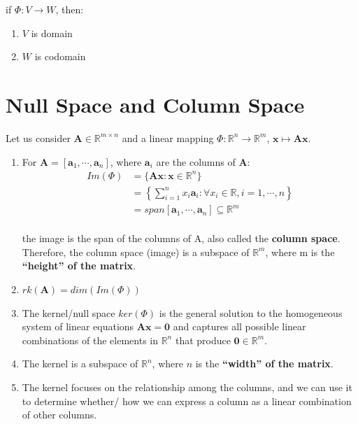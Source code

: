 if $\Phi : V \to W$, then:
\begin{enumerate}
    \item $V$ is domain
    \item $W$ is codomain
\end{enumerate}


\section{Null Space and Column Space \cite{mfml-1}}\label{Null Space and Column Space}

Let us consider $\mathbf{A} \in \mathbb{R}^{m\times n}$ and a linear mapping $\Phi : \mathbb{R}^n \to \mathbb{R}^m$, $\mathbf{x} \mapsto \mathbf{Ax}$.

\begin{enumerate}
    \item For $\mathbf{A} = [\mathbf{a}_1, \cdots , \mathbf{a}_n]$, where $\mathbf{a}_i$ are the columns of $\mathbf{A}$:
    \begin{align*}
        \displaystyle
        Im(\Phi) 
        &= \{ \mathbf{Ax} : \mathbf{x} \in \mathbb{R}^n \} \\
        &= \left\{ \sum_{i=1}^{n} x_i\mathbf{a}_i : \forall x_i \in \mathbb{R}, i=1,\cdots,n \right\} \\
        &= span[\mathbf{a}_1,\cdots, \mathbf{a}_n] \subseteq \mathbb{R}^m \\
    \end{align*}

    the image is the span of the columns of A, also called the \textbf{column space}. Therefore, the column space (image) is a subspace of $\mathbb{R}^m$, where m is the \textbf{“height” of the matrix}.

    \item $rk(\mathbf{A}) = dim(Im(\Phi))$

    \item The kernel/null space $ker(\Phi)$ is the general solution to the homogeneous system of linear equations $\mathbf{Ax = 0}$ and captures all possible linear combinations of the elements in $\mathbb{R}^n$ that produce $\mathbf{0} \in \mathbb{R}^m$.

    \item The kernel is a subspace of $\mathbb{R}^n$, where $n$ is the \textbf{“width” of the matrix}.

    \item The kernel focuses on the relationship among the columns, and we can use it to determine whether/ how we can express a column as a linear combination of other columns.
\end{enumerate}



